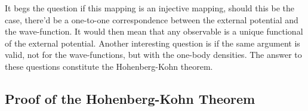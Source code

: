 \documentclass{homework}
\begin{document}
It begs the question if this mapping is an injective mapping, should this be the case, there'd be a one-to-one correspondence between the external potential and the wave-function. It would then mean that any observable is a unique functional of the external potential. Another interesting question is if the same argument is valid, not for the wave-functions, but with the one-body densities. The answer to these questions constitute the Hohenberg-Kohn theorem. \\

\subsection{Proof of the Hohenberg-Kohn Theorem}
\end{document}
